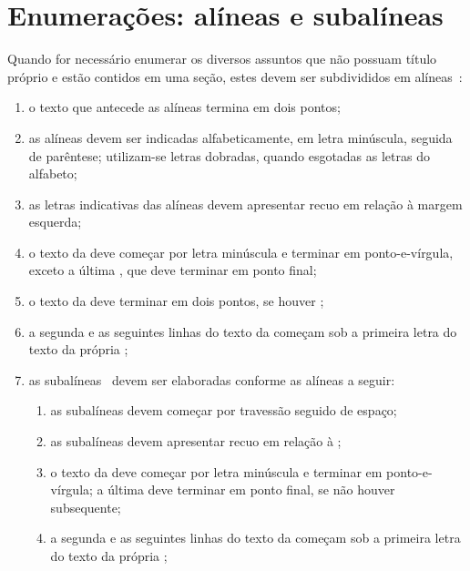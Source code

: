 \section{Enumerações: alíneas e subalíneas}%
\label{sect:enum}%
%

Quando for necessário enumerar os diversos assuntos que não possuam título próprio e estão contidos em uma seção, estes devem ser subdivididos em alíneas~\cite[ 4.2 \ppno~3 da  6024]{ABNT2012NBR6024}:

\begin{enumerate}[label = {\alphsect}]
\item o texto que antecede as alíneas termina em dois pontos;
\item as alíneas devem ser indicadas alfabeticamente, em letra minúscula, seguida de parêntese; utilizam-se letras dobradas, quando esgotadas as letras do alfabeto;
\item as letras indicativas das alíneas devem apresentar recuo em relação à margem esquerda;
\item o texto da  deve começar por letra minúscula e terminar em ponto-e-vírgula, exceto a última , que deve terminar em ponto final;
\item o texto da  deve terminar em dois pontos, se houver ;
\item a segunda e as seguintes linhas do texto da  começam sob a primeira letra do texto da própria ;
\item as subalíneas~\cite[ 4.3 \ppno~4 da  6024]{ABNT2012NBR6024} devem ser elaboradas conforme as alíneas a seguir:
\begin{enumerate}[label = {\textendash}]
\item as subalíneas devem começar por travessão seguido de espaço;
\item as subalíneas devem apresentar recuo em relação à ;
\item o texto da  deve começar por letra minúscula e terminar em ponto-e-vírgula; a última  deve terminar em ponto final, se não houver  subsequente;
\item a segunda e as seguintes linhas do texto da  começam sob a primeira letra do texto da própria ;

\end{enumerate}
\end{enumerate}
